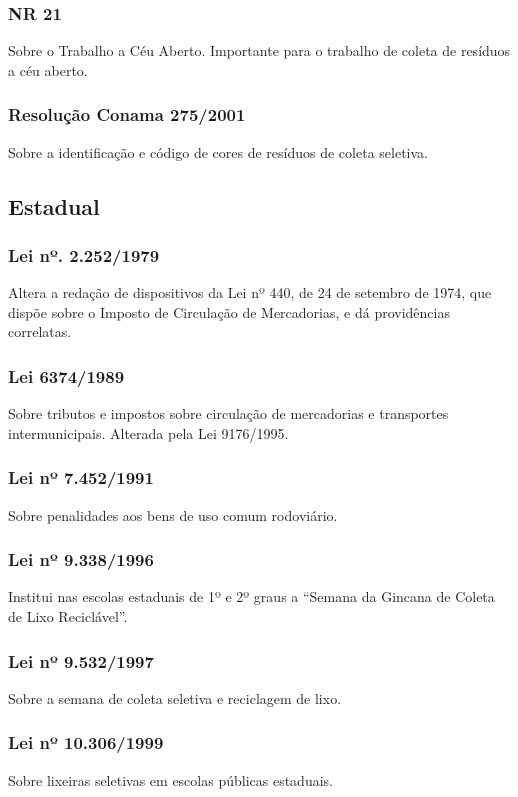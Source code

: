 \begin{subapend}
\begin{subsubapend}
		\subsubsection{NR 21}
		Sobre o Trabalho a Céu Aberto. Importante para o trabalho de coleta de resíduos a céu aberto.
		\subsubsection{Resolução Conama 275/2001}
		Sobre a identificação e código de cores de resíduos de coleta seletiva.
	\end{subsubapend}
\end{subapend}

\begin{subapend}
	\subsection{Estadual}
	\begin{subsubapend}
		\item \subsubsection{Lei nº. 2.252/1979}
		Altera a redação de dispositivos da Lei nº 440, de 24 de setembro de 1974, que dispõe sobre o Imposto de Circulação de Mercadorias, e dá providências correlatas.
		\subsubsection{Lei 6374/1989}
		Sobre tributos e impostos sobre circulação de mercadorias e transportes intermunicipais. Alterada pela Lei 9176/1995.
		\subsubsection{Lei nº 7.452/1991}
		Sobre penalidades aos bens de uso comum rodoviário.
		\subsubsection{Lei nº 9.338/1996}
		Institui nas escolas estaduais de 1º e 2º graus a “Semana da Gincana de Coleta de Lixo Reciclável”.
		\subsubsection{Lei nº 9.532/1997}
		Sobre a semana de coleta seletiva e reciclagem de lixo.
		\subsubsection{Lei nº 10.306/1999}
		Sobre lixeiras seletivas em escolas públicas estaduais.

\end{subsubapend}
\end{subapend}

